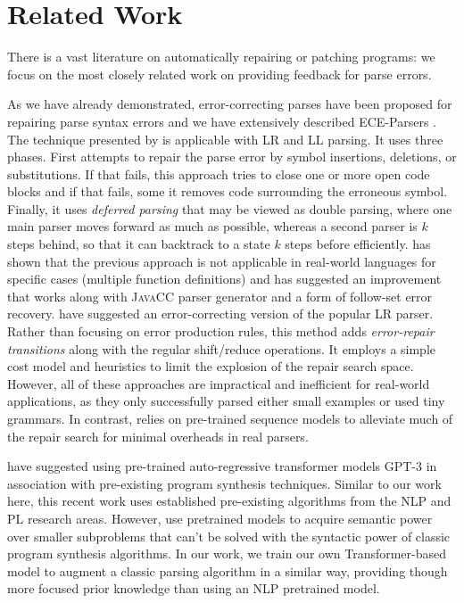 \section{Related Work}
\label{sec:related-work}

There is a vast literature on automatically repairing or patching programs:
we focus on the most closely related work on providing feedback for parse
errors.

%
As we have already demonstrated, error-correcting parses have been proposed for
repairing parse syntax errors and we have extensively described ECE-Parsers
\citep{Aho_1972}. The technique presented by \citep{Burke1987} is applicable
with LR and LL parsing. It uses three phases. First attempts to repair the parse
error by symbol insertions, deletions, or substitutions. If that fails, this
approach tries to close one or more open code blocks and if that fails, some it
removes code surrounding the erroneous symbol. Finally, it uses \emph{deferred
parsing} that may be viewed as double parsing, where one main parser moves
forward as much as possible, whereas a second parser is $k$ steps behind, so
that it can backtrack to a state $k$ steps before efficiently.
\citep{VanDerSpek_2005} has shown that the previous approach is not applicable
in real-world languages for specific cases (\eg multiple function definitions)
and has suggested an improvement that works along with \textsc{JavaCC} parser
generator and a form of follow-set error recovery. \citep{Corchuelo2002} have
suggested an error-correcting version of the popular LR parser. Rather than
focusing on error production rules, this method adds \emph{error-repair
transitions} along with the regular shift/reduce operations. It employs a simple
cost model and heuristics to limit the explosion of the repair search space.
However, all of these approaches are impractical and inefficient for real-world
applications, as they only successfully parsed either small examples or used
tiny grammars. In contrast, \toolname relies on pre-trained sequence models to
alleviate much of the repair search for minimal overheads in real parsers.

%
\citep{Rahmani2021, Verbruggen2021} have suggested using pre-trained
auto-regressive transformer models \ie \textsc{GPT-3} \citep{GPT2020} in
association with pre-existing program synthesis techniques. Similar to our work
here, this recent work uses established pre-existing algorithms from the NLP and
PL research areas. However, \citep{Rahmani2021, Verbruggen2021} use pretrained
models to acquire semantic power over smaller subproblems that can't be solved
with the syntactic power of classic program synthesis algorithms. In our work,
we train our own Transformer-based model to augment a classic parsing algorithm
in a similar way, providing though more focused prior knowledge than using an
NLP pretrained model.

